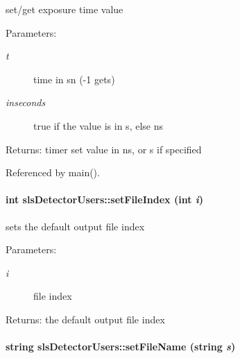 set/get exposure time value 

\begin{Desc}
\item[Parameters:]
\begin{description}
\item[{\em t}]time in sn (-1 gets) \item[{\em inseconds}]true if the value is in s, else ns \end{description}
\end{Desc}
\begin{Desc}
\item[Returns:]timer set value in ns, or s if specified \end{Desc}


Referenced by main().\hypertarget{classslsDetectorUsers_6b92ea7e237c77aa5107d7aabf76fe2d}{
\paragraph[setFileIndex]{\setlength{\rightskip}{0pt plus 5cm}int sls\-Detector\-Users::set\-File\-Index (int {\em i})}\hfill}
\label{classslsDetectorUsers_6b92ea7e237c77aa5107d7aabf76fe2d}


sets the default output file index 

\begin{Desc}
\item[Parameters:]
\begin{description}
\item[{\em i}]file index \end{description}
\end{Desc}
\begin{Desc}
\item[Returns:]the default output file index \end{Desc}
\hypertarget{classslsDetectorUsers_ff4a8ff4852e50d4ec05204cbc7fea9e}{
\paragraph[setFileName]{\setlength{\rightskip}{0pt plus 5cm}string sls\-Detector\-Users::set\-File\-Name (string {\em s})}\hfill}
\label{classslsDetectorUsers_ff4a8ff4852e50d4ec05204cbc7fea9e}


